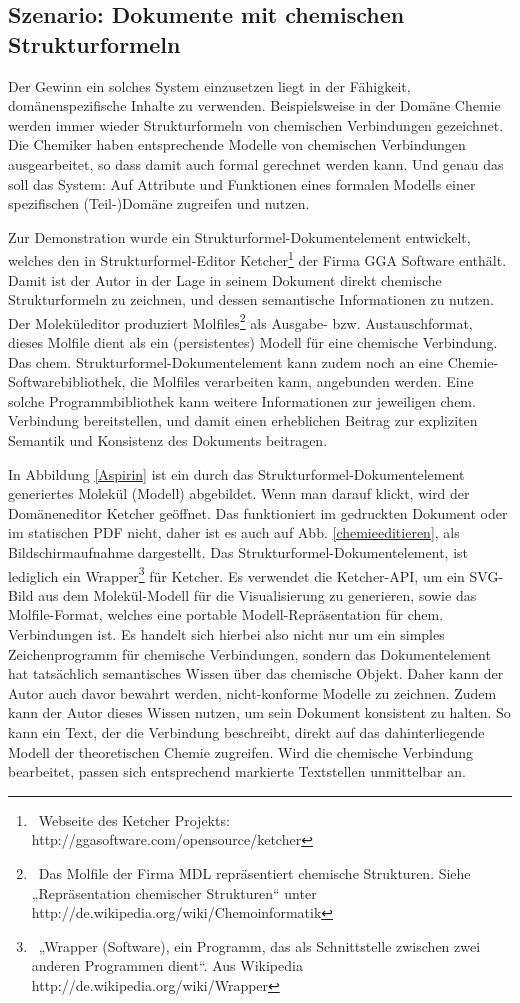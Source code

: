 
\subsection{Szenario: Dokumente mit chemischen Strukturformeln}\label{chemie-szenario}
 
Der Gewinn ein solches System einzusetzen liegt in der Fähigkeit, domänenspezifische Inhalte zu verwenden. Beispielsweise in der Domäne Chemie werden immer wieder Strukturformeln von chemischen Verbindungen gezeichnet. Die Chemiker haben entsprechende Modelle von chemischen Verbindungen ausgearbeitet, so dass damit auch formal gerechnet werden kann. Und genau das soll das System: Auf Attribute und Funktionen eines formalen Modells einer spezifischen (Teil-)Domäne zugreifen und nutzen.

 
Zur Demonstration wurde ein Strukturformel-Dokumentelement entwickelt, welches den in Strukturformel-Editor Ketcher\footnote{~Webseite des Ketcher Projekts: http://ggasoftware.com/opensource/ketcher} der Firma GGA Software enthält. Damit ist der Autor in der Lage in seinem Dokument direkt chemische Strukturformeln zu zeichnen, und dessen semantische Informationen zu nutzen. Der Moleküleditor produziert Molfiles\footnote{~Das Molfile der Firma MDL repräsentiert chemische Strukturen. Siehe „Repräsentation chemischer Strukturen“ unter http://de.wikipedia.org/wiki/Chemoinformatik } als Ausgabe- bzw. Austauschformat, dieses Molfile dient als ein (persistentes) Modell für eine chemische Verbindung. Das chem. Strukturformel-Dokumentelement kann zudem noch an eine Chemie-Softwarebibliothek, die Molfiles verarbeiten kann, angebunden werden. Eine solche Programmbibliothek kann weitere Informationen zur jeweiligen chem. Verbindung bereitstellen, und damit einen erheblichen Beitrag zur expliziten Semantik und Konsistenz des Dokuments beitragen.

 
In Abbildung \ref{Aspirin} ist ein durch das Strukturformel-Dokumentelement generiertes Molekül (Modell) abgebildet. Wenn man darauf klickt, wird der Domäneneditor Ketcher geöffnet. Das funktioniert im gedruckten Dokument oder im statischen PDF nicht, daher ist es auch auf Abb. \ref{chemieeditieren}, als Bildschirmaufnahme dargestellt. Das Strukturformel-Dokumentelement, ist lediglich ein Wrapper\footnote{~„Wrapper (Software), ein Programm, das als Schnittstelle zwischen zwei anderen Programmen dient“. Aus Wikipedia http://de.wikipedia.org/wiki/Wrapper} für Ketcher. Es verwendet die Ketcher-API, um ein SVG-Bild aus dem Molekül-Modell für die Visualisierung zu generieren, sowie das Molfile-Format, welches eine portable Modell-Repräsentation für chem. Verbindungen ist. Es handelt sich hierbei also nicht nur um ein simples Zeichenprogramm für chemische Verbindungen, sondern das Dokumentelement hat tatsächlich semantisches Wissen über das chemische Objekt. Daher kann der Autor auch davor bewahrt werden, nicht-konforme Modelle zu zeichnen. Zudem kann der Autor dieses Wissen nutzen, um sein Dokument konsistent zu halten. So kann ein Text, der die Verbindung beschreibt, direkt auf das dahinterliegende Modell der theoretischen Chemie zugreifen. Wird die chemische Verbindung bearbeitet, passen sich entsprechend markierte Textstellen unmittelbar an.

